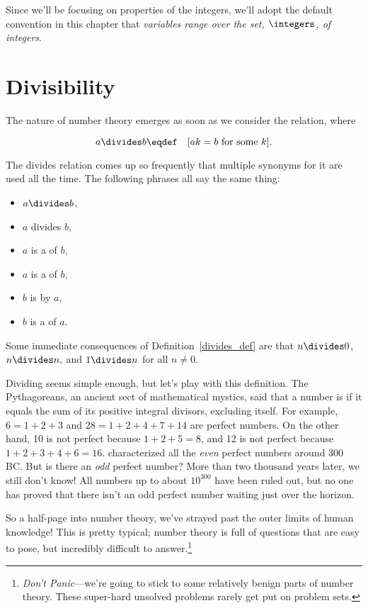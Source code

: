 Since we'll be focusing on properties of the integers, we'll adopt
the default convention in this chapter that \emph{variables range over
the set, $\integers$, of integers}.


\section{Divisibility}\label{divisibility_sec}

The nature of number theory emerges as soon as we consider the
 relation, where
\begin{definition}\label{divides_def}
\[
a \divides b \eqdef\quad [ ak = b \text{ for some } k].
\]
\end{definition}
The divides relation comes up so frequently that multiple synonyms for
it are used all the time.  The following phrases all say the same
thing:
\begin{itemize}
\item $a \divides b$,
\item $a$ divides $b$,
\item $a$ is a  of $b$,
\item $a$ is a  of $b$,
\item $b$ is  by $a$,
\item $b$ is a  of $a$.
\end{itemize}
Some immediate consequences of Definition~\ref{divides_def} are that
$n \divides 0$, $n \divides n,$ and $1 \divides n$ for all $n \neq 0$.

Dividing seems simple enough, but let's play with this definition.
The Pythagoreans, an ancient sect of mathematical mystics, said that a
number is  if it equals the sum
of its positive integral divisors, excluding itself.  For example, $6
= 1 + 2 + 3$ and $28 = 1 + 2 + 4 + 7 + 14$ are perfect numbers.  On
the other hand, 10 is not perfect because $1 + 2 + 5 = 8$, and 12 is
not perfect because $1 + 2 + 3 + 4 + 6 = 16$.  
characterized all the \emph{even} perfect numbers around 300 BC.  But
is there an \emph{odd} perfect number?  More than two thousand years
later, we still don't know!  All numbers up to about $10^{300}$ have
been ruled out, but no one has proved that there isn't an odd perfect
number waiting just over the horizon.

So a half-page into number theory, we've strayed past the outer limits
of human knowledge!  This is pretty typical; number theory is full of
questions that are easy to pose, but incredibly difficult to
answer.\footnote{\emph{Don't Panic}---we're going to stick to some
relatively benign parts of number theory.  These super-hard unsolved
problems rarely get put on problem sets.}

